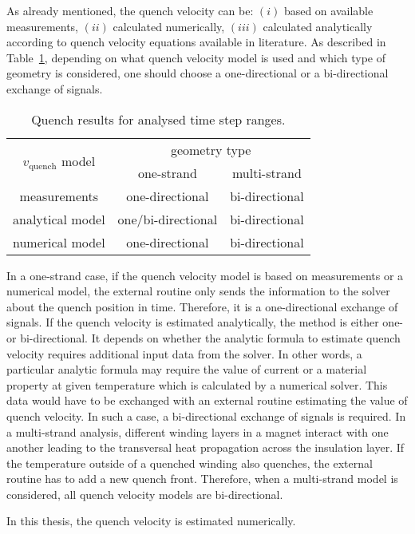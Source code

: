 As already mentioned, the quench velocity can be: $(i)$ based on available measurements, $(ii)$ calculated numerically, $(iii)$ calculated analytically according to quench velocity equations available in literature. As described in Table~\ref{table:uni_bi_directional_table_explanation}, depending on what quench velocity model is used and which type of geometry is considered, one should choose a one-directional or a bi-directional exchange of signals.

\begin{table}[H]
    \caption{Quench results for analysed time step ranges.} 
    \vspace{-1.em} 
    \fontsize{10}{10}
    \selectfont 
    \renewcommand{\arraystretch}{1.5}
    \begin{center}
        \begin{tabular}{ c | c | c }  
        \hline
         \multirow{2}{*}{$v_\text{quench}$ model} & \multicolumn{2}{c}{geometry type} \\ 
         & one-strand & multi-strand \\
         \hline
        measurements & one-directional & bi-directional \\
        analytical model & one/bi-directional & bi-directional \\
        numerical model & one-directional & bi-directional \\
        \hline 
        \end{tabular}
    \end{center}  
     \label{table:uni_bi_directional_table_explanation} 
 \end{table}

In a one-strand case, if the quench velocity model is based on measurements or a numerical model, the external routine only sends the information to the solver about the quench position in time. Therefore, it is a one-directional exchange of signals. If the quench velocity is estimated analytically, the method is either one- or bi-directional. It depends on whether the analytic formula to estimate quench velocity requires additional input data from the solver. In other words, a particular analytic formula may require the value of current or a material property at given temperature which is calculated by a numerical solver. This data would have to be exchanged with an external routine estimating the value of quench velocity. In such a case, a bi-directional exchange of signals is required. In a multi-strand analysis, different winding layers in a magnet interact with one another leading to the transversal heat propagation across the insulation layer. If the temperature outside of a quenched winding also quenches, the external routine has to add a new quench front. Therefore, when a multi-strand model is considered, all quench velocity models are bi-directional.

In this thesis, the quench velocity is estimated numerically.
